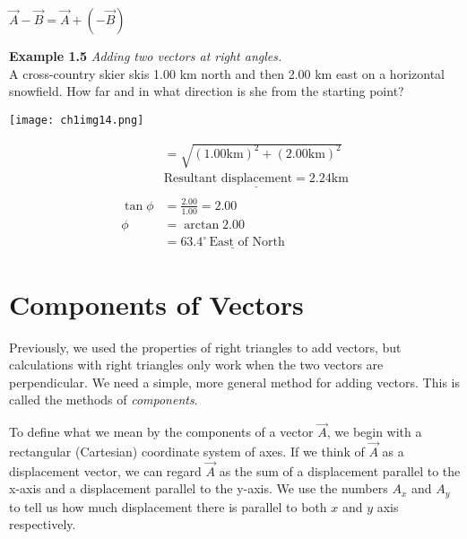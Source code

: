 \begin{center}
$\overrightarrow{A} - \overrightarrow{B} = \overrightarrow{A} + \left(- \overrightarrow{B}\right)$
\end{center}

\begin{examplebox}
\textbf{Example 1.5} \textit{Adding two vectors at right angles.}\\

A cross-country skier skis 1.00 km north and then 2.00 km east on a horizontal snowfield. How far and in what direction is she from the starting point?
\begin{center}
\texttt{[image: ch1img14.png]}
\end{center}
\begin{mathbox}
\begin{align*}
&= \sqrt{\left(1.00 \text{km}\right)^2 + \left(2.00 \text{km}\right)^2}\\
&\underline{\text{Resultant displacement} = 2.24 \text{km}}\\\\
\tan \phi &= \frac{2.00}{1.00} = 2.00\\
\phi &= \arctan 2.00\\
&= \underline{63.4 ^\circ\, \text{East of North}}
\end{align*}
\end{mathbox}
\end{examplebox}
\bigskip

\section{Components of Vectors}
Previously, we used the properties of right triangles to add vectors, but calculations with right triangles only work when the two vectors are perpendicular. We need a simple, more general method for adding vectors. This is called the methods of \textit{components}.

To define what we mean by the components of a vector $\overrightarrow{A}$, we begin with a rectangular (Cartesian) coordinate system of axes. If we think of $\overrightarrow{A}$ as a displacement vector, we can regard $\overrightarrow{A}$ as the sum of a displacement parallel to the x-axis and a displacement parallel to the y-axis. We use the numbers $A_x$ and $A_y$ to tell us how much displacement there is parallel to both $x$ and $y$ axis respectively.\\

